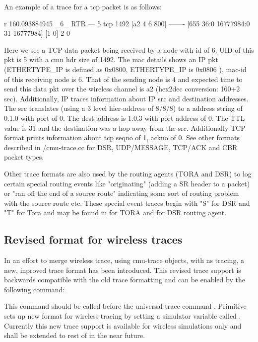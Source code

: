 An example of a trace for a tcp packet is as follows:
\begin{program}
r 160.093884945 _6_ RTR  --- 5 tcp 1492 [a2 4 6 800] ------- [655
36:0 16777984:0 31 16777984] [1 0] 2 0
\end{program}
Here we see a TCP data packet being received by a node with id of 6. UID
of this pkt is 5 with a cmn hdr size of 1492. The mac details shows an IP
pkt (ETHERTYPE\_IP is defined as 0x0800, ETHERTYPE\_IP is 0x0806 ), mac-id
of this receiving node is 6. That of the sending node is 4 and expected
time to send this data pkt over the wireless channel is a2 (hex2dec
conversion: 160+2 sec). Additionally, IP traces information about IP src
and destination addresses. The src translates (using a 3 level
hier-address of 8/8/8) to a address string of 0.1.0 with port of 0. The
dest address is 1.0.3 with port address of 0. The TTL value is 31 and the
destination was a hop away from the src. Additionally TCP format prints
information about tcp seqno of 1, ackno of 0. See other formats described
in \nsf/cmu-trace.cc for DSR, UDP/MESSAGE, TCP/ACK and CBR packet types.

Other trace formats are also used by the routing agents (TORA and DSR) to
log certain special routing events like "originating" (adding a SR header
to a packet) or  "ran off the end of a source route" indicating some sort
of routing problem with the source route etc. These special event traces
begin with "S" for DSR and "T" for Tora and may
be found in  for TORA and  for DSR
routing agent.


\subsection{Revised format for wireless traces}
\label{sec:revtraceformat}

In an effort to merge wireless trace, using cmu-trace objects, with
ns tracing, a new, inproved trace format has been introduced. This revised
trace support is backwards compatible with the old trace formatting and
can be enabled by the following command:
This command should be called before the universal trace command . Primitive  sets up new
format for wireless tracing by setting a simulator variable called
. Currently this new trace support is available for
wireless simulations only and shall be extended to rest of \ns in the near
future.

